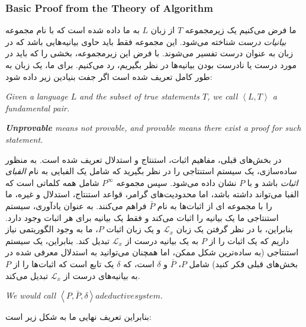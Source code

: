 \documentclass[10pt,a4paper]{article}
\newcommand{\curveL}{\mathcal{L}}
\begin{document}
                    \subsubsection{Basic Proof from the Theory of Algorithm\cite{Uspensky1995-sm}}
ما فرض می‌کنیم یک زیرمجموعه $T$ از زبان $L$ به ما داده شده است که با نام مجموعه \textit{بیانیات درست} شناخته می‌شود. این مجموعه فقط باید حاوی بیانیه‌هایی باشد که در زبان به عنوان درست تفسیر می‌شوند. با فرض این زیرمجموعه، بخشی را که باید در مورد درست یا نادرست بودن بیانیه‌ها در نظر بگیریم، رد می‌کنیم. برای ما، یک زبان به طور کامل تعریف شده است اگر جفت بنیادین زیر داده شود:
                        \begin{define}
                            \textit{Given a language $L$ and the subset of true statements $T$, we call $\left<L,T\right>$ a fundamental pair.}
                        \end{define}
                        \begin{define}
                            \textit{\textbf{Unprovable} means not provable, and provable means there exist a proof for such statement.}
                        \end{define}
در بخش‌های قبلی، مفاهیم اثبات، استنتاج و استدلال تعریف شده است. به منظور ساده‌سازی، یک سیستم استنتاجی را در نظر بگیرید که شامل یک الفبایی به نام \textit{الفبای اثبات} باشد و با $P$ نشان داده می‌شود. سپس مجموعه $P^\infty$ شامل همه کلماتی است که الفبا می‌تواند داشته باشد، اما محدودیت‌های گرامر، قواعد استنتاج، استدلال و غیره، ما را با مجموعه ای از اثبات‌ها به نام $\bar{P}$ فراهم می‌کنند. به عنوان یادآوری، سیستم استنتاجی ما یک بیانیه را اثبات می‌کند و فقط یک بیانیه برای هر اثبات وجود دارد. بنابراین، با در نظر گرفتن یک زبان $\curveL_x$ و یک زبان اثبات $P$، ما به وجود الگوریتمی نیاز داریم که یک اثبات را از $P$ به یک بیانیه درست از $\curveL_x$ تبدیل کند. بنابراین، یک سیستم استنتاجی (به ساده‌ترین شکل ممکن، اما همچنان می‌توانید به استدلال معرفی شده در بخش‌های قبلی فکر کنید) شامل $P$، $\bar{P}$ و $\delta$ است، که $\delta$ یک تابع است که اثبات‌ها را از $P$ به بیانیه‌های درست از $\curveL_x$ تبدیل می‌کند.
                        \begin{define}
                            \textit{We would call $\left<P,\bar P, \delta\right> a deductive system.$}
                        \end{define}
بنابراین تعریف نهایی ما به شکل زیر است:
\end{document}
